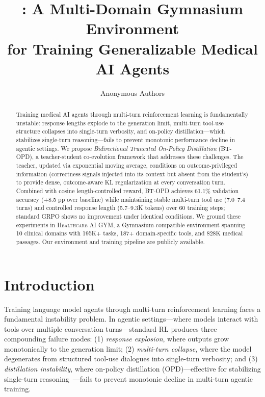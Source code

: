 \documentclass{article}
\title{\gym{}: A Multi-Domain Gymnasium Environment \\
for Training Generalizable Medical AI Agents}
\author{%
  Anonymous Authors \\
}
\newcommand{\gym}{\textsc{Healthcare AI GYM}}
\begin{document}
\maketitle

\begin{abstract}
Training medical AI agents through multi-turn reinforcement learning is fundamentally unstable: response lengths explode to the generation limit, multi-turn tool-use structure collapses into single-turn verbosity, and on-policy distillation---which stabilizes single-turn reasoning---fails to prevent monotonic performance decline in agentic settings. We propose \emph{Bidirectional Truncated On-Policy Distillation} (BT-OPD), a teacher-student co-evolution framework that addresses these challenges. The teacher, updated via exponential moving average, conditions on outcome-privileged information (correctness signals injected into its context but absent from the student's) to provide dense, outcome-aware KL regularization at every conversation turn. Combined with cosine length-controlled reward, BT-OPD achieves 61.1\% validation accuracy (+8.5 pp over baseline) while maintaining stable multi-turn tool use (7.0--7.4 turns) and controlled response length (5.7--9.3K tokens) over 60 training steps; standard GRPO shows no improvement under identical conditions. We ground these experiments in \gym{}, a Gymnasium-compatible environment spanning 10 clinical domains with 195K+ tasks, 187+ domain-specific tools, and 828K medical passages. Our environment and training pipeline are publicly available.

\end{abstract}

\section{Introduction}
\label{sec:intro}

Training language model agents through multi-turn reinforcement learning faces a fundamental instability problem. In agentic settings---where models interact with tools over multiple conversation turns---standard RL produces three compounding failure modes: (1) \emph{response explosion}, where outputs grow monotonically to the generation limit; (2) \emph{multi-turn collapse}, where the model degenerates from structured tool-use dialogues into single-turn verbosity; and (3) \emph{distillation instability}, where on-policy distillation (OPD)---effective for stabilizing single-turn reasoning~\citep{zhao26opsd, yang26rlsd}---fails to prevent monotonic decline in multi-turn agentic training.
\end{document}
